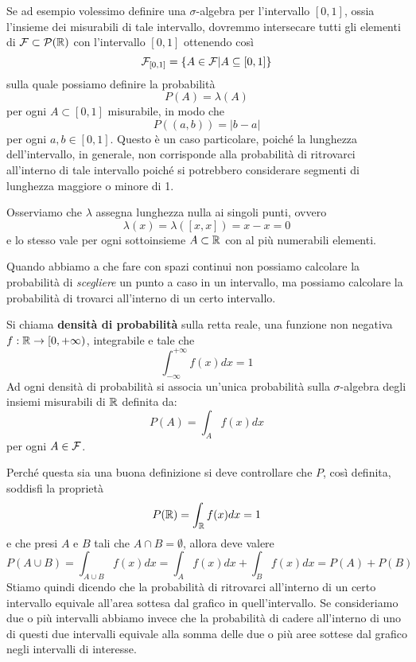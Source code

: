 Se ad esempio volessimo definire una $\sigma$-algebra per l'intervallo $[0,1]$, ossia l'insieme dei
misurabili di tale intervallo, dovremmo intersecare tutti gli elementi di
$\mathcal{F} \subset \mathcal{P}(\mathbb{R})$ con l'intervallo $[0,1]$ ottenendo così
\[ \mathcal{F}_{[0,1]} = \{ A \in \mathcal{F} | A \subseteq [0,1] \} \]
sulla quale possiamo definire la probabilità
\[ P (A) = \lambda (A) \]
per ogni $A \subset [0,1]$ misurabile, in modo che
\[ P((a, b)) = |b - a| \]
per ogni $a,b \in [0,1]$. Questo è un caso particolare, poiché la lunghezza dell'intervallo, in
generale, non corrisponde alla probabilità di ritrovarci all'interno di tale intervallo poiché si
potrebbero considerare segmenti di lunghezza maggiore o minore di 1.

\begin{observation}
	Osserviamo che $\lambda$ assegna lunghezza nulla ai singoli punti, ovvero
	\[ \lambda(x) = \lambda([x,x]) = x - x = 0 \]
	e lo stesso vale per ogni sottoinsieme $A \subset \mathbb{R}$ con al più numerabili elementi.
\end{observation}

Quando abbiamo a che fare con spazi continui non possiamo calcolare la probabilità di
\emph{scegliere} un punto a caso in un intervallo, ma possiamo calcolare la probabilità di trovarci
all'interno di un certo intervallo.

\begin{definition}
	Si chiama \textbf{densità di probabilità} sulla retta reale, una funzione non negativa
	$f : \mathbb{R} \to [0, +\infty)$, integrabile e tale che
	\[ \int_{-\infty}^{+\infty} f(x) dx = 1 \]
	Ad ogni densità di probabilità si associa un'unica probabilità sulla $\sigma$-algebra degli
	insiemi misurabili di $\mathbb{R}$ definita da:
	\[ P(A) = \int_A f(x) dx \]
	per ogni $A \in \mathcal{F}$.
\end{definition}

Perché questa sia una buona definizione si deve controllare che $P$, così definita, soddisfi la
proprietà
\[ P(\mathbb{R}) = \int_{\mathbb{R}} f(x) dx = 1 \]
e che presi $A$ e $B$ tali che $A \cap B = \emptyset$, allora deve valere
\[ P(A \cup B) = \int_{A \cup B} f(x) dx = \int_A f(x) dx + \int_B f(x) dx = P(A) + P(B) \]
Stiamo quindi dicendo che la probabilità di ritrovarci all'interno di un certo intervallo equivale
all'area sottesa dal grafico in quell'intervallo. Se consideriamo due o più intervalli abbiamo
invece che la probabilità di cadere all'interno di uno di questi due intervalli equivale alla
somma delle due o più aree sottese dal grafico negli intervalli di interesse.

